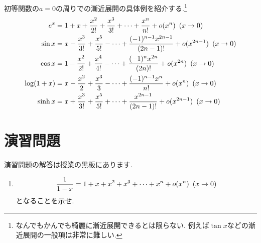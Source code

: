 \documentclass[dvipdfmx,a4paper,11pt]{article}
\theoremstyle{definition}
\begin{document}
 初等関数の$a=0$の周りでの漸近展開の具体例を紹介する.\footnote{なんでもかんでも綺麗に漸近展開できるとは限らない. 例えば$\tan x$などの漸近展開の一般項は非常に難しい.}
\begin{align*}
\begin{split}
e^x &= 1 + x+  \frac{x^2}{2!} + \frac{x^3}{3!}  + \cdots  + 
 \frac{ x^{n}}{n!} + o(x^{n}) \text{\,\,\,}(x \rightarrow 0) \\
\sin x &= x - \frac{x^3}{3!} + \frac{x^5}{5!} - \cdots  + 
 \frac{(-1)^{n-1} x^{2n-1}}{(2n-1)!} 
 + o(x^{2n-1}) \text{\,\,\,}(x \rightarrow 0) \\
 \cos x &= 1 - \frac{x^2}{2!} + \frac{x^4}{4!} - \cdots  + 
 \frac{(-1)^{n} x^{2n}}{(2n)!} 
 + o(x^{2n}) \text{\,\,\,}(x \rightarrow 0) \\
 \log(1+x) &= x - \frac{x^2}{2} + \frac{x^3}{3}  - \cdots   
 + \frac{ (-1)^{n-1}x^{n}}{n!} + o(x^{n}) \text{\,\,\,}(x \rightarrow 0) \\
  \sinh x &= x + \frac{x^3}{3!} + \frac{x^5}{5!} + \cdots  + 
 \frac{x^{2n-1}}{(2n-1)!} 
 + o(x^{2n-1}) \text{\,\,\,}(x \rightarrow 0) \\
\end{split}
\end{align*}

 
\section{演習問題}
演習問題の解答は授業の黒板にあります.
\begin{enumerate}
\item 
$$
\frac{1}{1-x} = 1 + x+  x^2 + x^3  + \cdots   
 + x^{n} + o(x^{n}) \text{\,\,\,}(x \rightarrow 0) 
$$
となることを示せ.

\end{enumerate}
\end{document}
